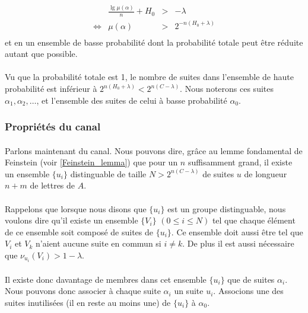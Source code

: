 	\[
		\begin{array}{crcl}
			&\frac{\lg \mu\left(\alpha\right)}{n}+H_0 &>& -\lambda\\
			\Leftrightarrow & \mu(\alpha) & > &2^{-n\left(H_0+\lambda\right)}\\
		\end{array}
	\]
	et en un ensemble de basse probabilité dont la probabilité totale peut être 
	réduite autant que possible.

	\paragraph{}
	Vu que la probabilité totale est 1, le nombre de suites dans l'ensemble
	de haute probabilité est inférieur à $2^{n(H_0+\lambda)}<2^{n(C-\lambda)}$.
	Nous noterons ces suites $\alpha_1,\alpha_2,\dots$, et l'ensemble des
	suites de celui à basse probabilité $\alpha_0$.
	
\subsubsection*{Propriétés du canal}
	
	\paragraph{}
	Parlons maintenant du canal. Nous pouvons dire, grâce au lemme fondamental
	de Feinstein (voir \ref{Feinstein_lemma}) que pour un $n$ suffisamment
	grand, il existe un ensemble $\{u_i\}$ distinguable de taille 
	$N > 2^{n(C-\lambda)}$ de suites $u$ de longueur $n+m$ de lettres 
	de $A$.
	
	\paragraph{}
	Rappelons que lorsque nous disons que $\{u_i\}$ est un groupe distinguable,
	nous voulons dire qu'il existe un ensemble $\{V_i\}$ $(0 \le i \le N)$ 
	tel que chaque élément de ce ensemble soit composé de suites de $\{u_i\}$.
	Ce ensemble doit aussi être tel que $ V_i$ et $V_k$ n'aient aucune suite
	en commun si $i\neq k$. De plus il est aussi nécessaire que
	$\nu_{u_i}(V_i) > 1-\lambda$. 
	
	\paragraph{}
	Il existe donc davantage de membres dans cet ensemble $\{u_i\}$ que de 
	suites $\alpha_i$. Nous pouvons donc associer à chaque suite 
	$\alpha_i$ un suite $u_i$. Associons une des suites inutilisées 
	(il en reste au moins une) de $\{u_i\}$ à $\alpha_0$.
	
